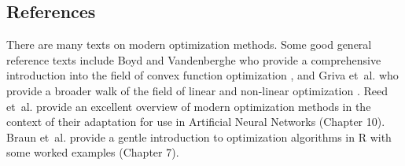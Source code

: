 \begin{bibunit}
\subsection{References}
There are many texts on modern optimization methods. Some good general reference texts include Boyd and Vandenberghe  who provide a comprehensive introduction into the field of convex function optimization \cite{Boyd2004}, and Griva et~al. who provide a broader walk of the field of linear and non-linear optimization \cite{Griva2009}.
Reed et~al. provide an excellent overview of modern optimization methods in the context of their adaptation for use in Artificial Neural Networks \cite{Reed1998} (Chapter 10).
Braun et~al. provide a gentle introduction to optimization algorithms in R with some worked examples \cite{Braun2007} (Chapter 7).

\putbib
\end{bibunit}

\newpage\begin{bibunit}\putbib\end{bibunit}
\newpage\begin{bibunit}\putbib\end{bibunit}
\newpage\begin{bibunit}\putbib\end{bibunit}
\newpage\begin{bibunit}\putbib\end{bibunit}
\newpage\begin{bibunit}\putbib\end{bibunit}
\newpage\begin{bibunit}\putbib\end{bibunit}
\newpage\begin{bibunit}\putbib\end{bibunit}

